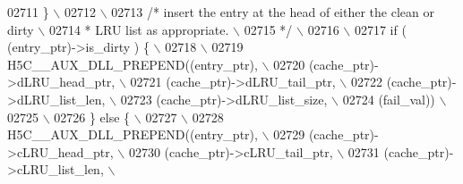 \begin{DoxyCode}
02711 \textcolor{preprocessor}{            \}                                                                \(\backslash\)}
02712 \textcolor{preprocessor}{                                                                             \(\backslash\)}
02713 \textcolor{preprocessor}{            }\textcolor{comment}{/* insert the entry at the head of either the clean or dirty     \(\backslash\)}
02714 \textcolor{comment}{         * LRU list as appropriate.                                      \(\backslash\)}
02715 \textcolor{comment}{             */}\textcolor{preprocessor}{                                                              \(\backslash\)}
02716 \textcolor{preprocessor}{                                                                             \(\backslash\)}
02717 \textcolor{preprocessor}{            if ( (entry\_ptr)->is\_dirty ) \{                                   \(\backslash\)}
02718 \textcolor{preprocessor}{                                                                             \(\backslash\)}
02719 \textcolor{preprocessor}{                H5C\_\_AUX\_DLL\_PREPEND((entry\_ptr),                            \(\backslash\)}
02720 \textcolor{preprocessor}{                      (cache\_ptr)->dLRU\_head\_ptr,            \(\backslash\)}
02721 \textcolor{preprocessor}{                                      (cache\_ptr)->dLRU\_tail\_ptr,            \(\backslash\)}
02722 \textcolor{preprocessor}{                                      (cache\_ptr)->dLRU\_list\_len,            \(\backslash\)}
02723 \textcolor{preprocessor}{                                      (cache\_ptr)->dLRU\_list\_size,           \(\backslash\)}
02724 \textcolor{preprocessor}{                      (fail\_val))                            \(\backslash\)}
02725 \textcolor{preprocessor}{                                                                             \(\backslash\)}
02726 \textcolor{preprocessor}{            \} else \{                                                         \(\backslash\)}
02727 \textcolor{preprocessor}{                                                                             \(\backslash\)}
02728 \textcolor{preprocessor}{                H5C\_\_AUX\_DLL\_PREPEND((entry\_ptr),                            \(\backslash\)}
02729 \textcolor{preprocessor}{                      (cache\_ptr)->cLRU\_head\_ptr,            \(\backslash\)}
02730 \textcolor{preprocessor}{                                      (cache\_ptr)->cLRU\_tail\_ptr,            \(\backslash\)}
02731 \textcolor{preprocessor}{                                      (cache\_ptr)->cLRU\_list\_len,            \(\backslash\)}

\end{DoxyCode}
